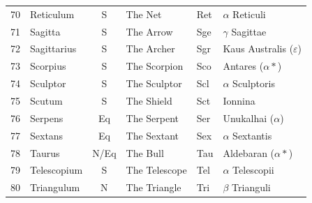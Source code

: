 \documentclass[a4paper,12pt]{extarticle}
\begin{document}
\begin{table}[H]
\begin{tabular}{llclll}
70                         & Reticulum                            & S                               & The Net                                & Ret                         & $\alpha$ Reticuli                     \\
71                         & Sagitta                              & S                               & The Arrow                              & Sge                         & $\gamma$ Sagittae                     \\
72                         & Sagittarius                          & S                               & The Archer                             & Sgr                         & Kaus Australis ($\varepsilon$)        \\
73                         & Scorpius                             & S                               & The Scorpion                           & Sco                         & Antares ($\alpha \ast$)               \\
74                         & Sculptor                             & S                               & The Sculptor                           & Scl                         & $\alpha$ Sculptoris                   \\
75                         & Scutum                               & S                               & The Shield                             & Sct                         & Ionnina                               \\
76                         & Serpens                              & Eq                              & The Serpent                            & Ser                         & Unukalhai ($\alpha$)                  \\
77                         & Sextans                              & Eq                              & The Sextant                            & Sex                         & $\alpha$ Sextantis                    \\
78                         & Taurus                               & N/Eq                            & The Bull                               & Tau                         & Aldebaran ($\alpha \ast$)             \\
79                         & Telescopium                          & S                               & The Telescope                          & Tel                         & $\alpha$ Telescopii                   \\
80                         & Triangulum                           & N                               & The Triangle                           & Tri                         & $\beta$ Trianguli                     \\

\end{tabular}
\end{table}
\end{document}
